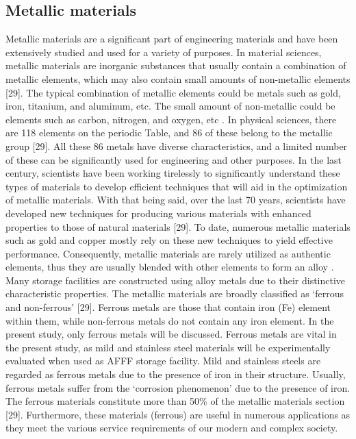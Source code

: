 \documentclass[12pt]{report}
\begin{document}
\subsection{Metallic materials}
Metallic materials are a significant part of engineering materials and have been extensively studied and used for a variety of purposes.  In material sciences, metallic materials are inorganic substances that usually contain a combination of metallic elements, which may also contain small amounts of non-metallic elements [29]. The typical combination of metallic elements could be metals such as gold, iron, titanium, and aluminum, etc. The small amount of non-metallic could be elements such as carbon, nitrogen, and oxygen, etc \cite{hench2005biomaterials}. In physical sciences, there are 118 elements on the periodic Table, and 86 of these belong to the metallic group [29]. All these 86 metals have diverse characteristics, and a limited number of these can be significantly used for engineering and other purposes.  
In the last century, scientists have been working tirelessly to significantly understand these types of materials to develop efficient techniques that will aid in the optimization of metallic materials. With that being said, over the last 70 years, scientists have developed new techniques for producing various materials with enhanced properties to those of natural materials [29]. To date, numerous metallic materials such as gold and copper mostly rely on these new techniques to yield effective performance. Consequently, metallic materials are rarely utilized as authentic elements, thus they are usually blended with other elements to form an alloy \cite{hench2005biomaterials}. Many storage facilities are constructed using alloy metals due to their distinctive characteristic properties.
The metallic materials are broadly classified as ‘ferrous and non-ferrous’ [29]. Ferrous metals are those that contain iron (Fe) element within them, while non-ferrous metals do not contain any iron element. In the present study, only ferrous metals will be discussed. Ferrous metals are vital in the present study, as mild and stainless steel materials will be experimentally evaluated when used as AFFF storage facility.  Mild and stainless steels are regarded as ferrous metals due to the presence of iron in their structure. Usually, ferrous metals suffer from the ‘corrosion phenomenon’ due to the presence of iron. The ferrous materials constitute more than 50\% of the metallic materials section [29]. Furthermore, these materials (ferrous) are useful in numerous applications as they meet the various service requirements of our modern and complex society.
\end{document}

